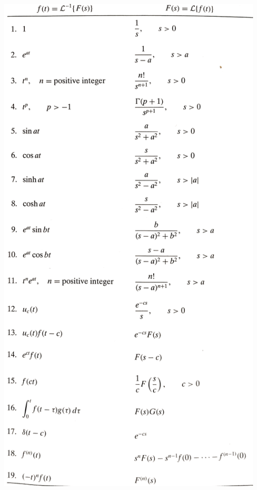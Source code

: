 \documentclass[10pt,landscape]{article}
\begin{document}
\begin{multicols}{3}
\includegraphics[width=0.9\columnwidth]{laplace}

%


\end{multicols}
\end{document}

